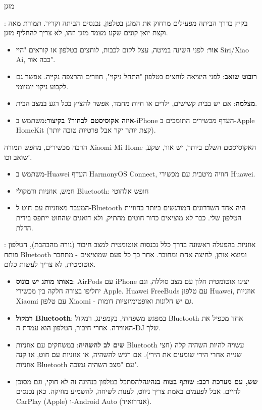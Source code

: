 
מזגן

: בקיץ בדרך הביתה מפעילים מרחוק את המזגן בטלפון, נכנסים הביתה וקריר. תמורת מאה וקצת יואן קונים שקע מצמד מזגן וזהו, לא צריך להחליף מזגן.

\begin{itemize}
  \item \textbf{אור}: לפני השינה במיטה, עצל לקום לכבות, לוחצים בטלפון או קוראים "היי Siri/Xiao Ai, כבה אור".
  \item \textbf{רובוט שואב}: לפני היציאה לוחצים בטלפון "התחל ניקוי", חוזרים והרצפה נקייה. אפשר גם לקבוע ניקוי יומיומי.
  \item \textbf{מצלמה}: אם יש בבית קשישים, ילדים או חיות מחמד, אפשר להציץ בכל רגע במצב הבית.
  \item \textbf{איזה אקוסיסטם לבחור? בקיצור:}משתמש ב-iPhone העדף מכשירים התומכים ב-Apple HomeKit (קצת יותר יקר אבל פרטיות טובה יותר).
\end{itemize}

הרבה מכשירים, מחפש תמורה Xiaomi Mi Home האקוסיסטם השלם ביותר, יש אור, שקע, שואב וכו'.

\begin{itemize}
  \item משתמש ב-Huawei העדף HarmonyOS Connect, חוויה מיטבית עם מכשירי Huawei.
  \item חמש, אוזניות ורמקולי Bluetooth: חופש אלחוטי
  \item המעבר מאוזניות עם חוט ל-Bluetooth היה אחד השדרוגים המורגשים ביותר בחוויית הטלפון שלי. כבר לא מוציאים כדור חוטים מהתיק, ולא דואגים שהחוט ייתפס בידית הדלת.
\end{itemize}


: אוזניות בהפעלה ראשונה בדרך כלל נכנסות אוטומטית למצב חיבור (נורה מהבהבת), הטלפון פותח Bluetooth ומוצא אותן, לחיצה אחת ומחובר. אחר כך כל פעם שמוציאים - מתחבר אוטומטית, לא צריך לעשות כלום.

\begin{itemize}
  \item \textbf{באותו מותג יש בונוס}: AirPods עם iPhone יציגו אוטומטית חלון עם מצב סוללה, וגם יחליפו בצורה חלקה בין מכשירי Apple. Huawei FreeBuds עם טלפון Huawei, אוזניות Xiaomi עם טלפון Xiaomi - גם יש חלונות ואופטימיזציות דומות.
  \item \textbf{רמקול Bluetooth}: במפגש משפחתי, בקמפינג, רמקול Bluetooth אחד מכפיל את האווירה. אחרי חיבור, הטלפון הוא עמדת ה-DJ שלך.
  \item \textbf{שים לב להשהיה}: במשחקים עם אוזניות Bluetooth עשויה להיות השהיה קלה (חצי שנייה אחרי הירי שומעים את הירי). אם רגיש להשהיה, או אוזניות עם חוט, או קנה אוזניות Bluetooth עם "מצב השהיה נמוכה".
  \item \textbf{שש, עם מערכת רכב: שותף בטוח בנהיגה}להסתכל בטלפון בנהיגה זה לא חוקי, וגם מסוכן לחיים. אבל לפעמים באמת צריך ניווט, לענות לשיחה, להשמיע מוזיקה. כאן נכנסים CarPlay (Apple) ו-Android Auto (אנדרואיד).
\end{itemize}

